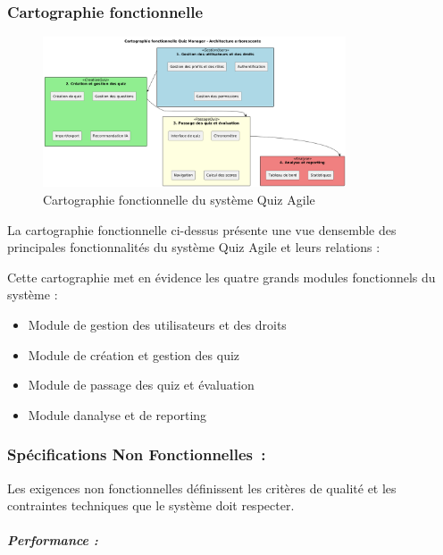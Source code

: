 \documentclass[12pt,a4paper,twoside]{report}
\begin{document}
\hypertarget{cartographie-fonctionnelle}{%
\subsubsection{Cartographie
fonctionnelle}\label{cartographie-fonctionnelle}}

\begin{figure}[H]
\centering
\includegraphics[width=0.8\textwidth]{latex_media/media/image11.png}
\caption{Cartographie fonctionnelle du système Quiz Agile}
\label{fig:cartographie-fonctionnelle}
\end{figure}

La
cartographie fonctionnelle ci-dessus présente une vue
d\textquotesingle ensemble des principales fonctionnalités du système
Quiz Agile et leurs relations :

Cette cartographie met en évidence les quatre grands modules
fonctionnels du système :

\begin{itemize}
\item
  Module de gestion des utilisateurs et des droits
\item
  Module de création et gestion des quiz
\item
  Module de passage des quiz et évaluation
\item
  Module d\textquotesingle analyse et de reporting
\end{itemize}

\hypertarget{spuxe9cifications-non-fonctionnelles}{%
\subsubsection{Spécifications Non
Fonctionnelles~:}\label{spuxe9cifications-non-fonctionnelles}}

Les exigences non fonctionnelles définissent les critères de qualité et
les contraintes techniques que le système doit respecter.

\hypertarget{performance}{%
\subparagraph{Performance :}\label{performance}}
\end{document}
